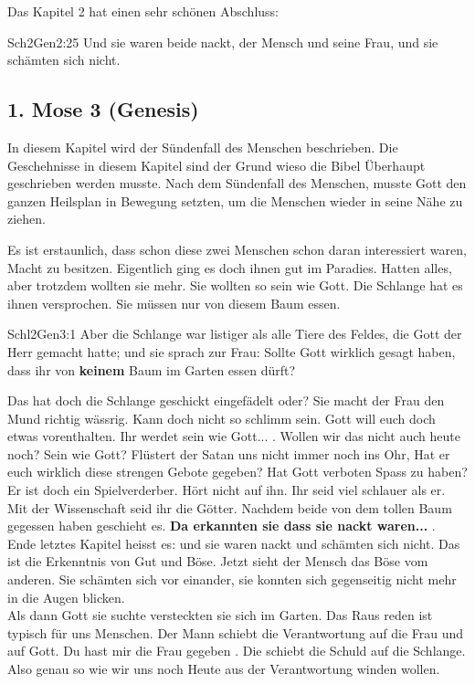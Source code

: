 Das Kapitel 2 hat einen sehr schönen Abschluss:
\begin{bibeltext}{Sch2}{Gen}{2:25}
	Und sie waren beide nackt, der Mensch und seine Frau, und sie schämten sich nicht.
\end{bibeltext}
\subsection{1. Mose 3 (Genesis)}
In diesem Kapitel wird der Sündenfall des Menschen beschrieben. Die Geschehnisse in diesem Kapitel sind der Grund wieso die Bibel Überhaupt geschrieben werden musste. Nach dem Sündenfall des Menschen, musste Gott den ganzen Heilsplan in Bewegung setzten, um die Menschen wieder in seine Nähe zu ziehen.

Es ist erstaunlich, dass schon diese zwei Menschen schon daran interessiert waren, Macht zu besitzen. Eigentlich ging es doch ihnen gut im Paradies. Hatten alles, aber trotzdem wollten sie mehr. Sie wollten so sein wie Gott. Die Schlange hat es ihnen versprochen. Sie müssen nur von diesem Baum essen.
\begin{bibeltext}{Schl2}{Gen}{3:1}
	Aber die Schlange war listiger als alle Tiere des Feldes, die Gott der Herr gemacht hatte; und sie sprach zur Frau: Sollte Gott wirklich gesagt haben, dass ihr von \textbf{keinem} Baum im Garten essen dürft?
\end{bibeltext}
Das hat doch die Schlange geschickt eingefädelt oder? Sie macht der Frau den Mund richtig wässrig. Kann doch nicht so schlimm sein. Gott will euch doch etwas vorenthalten. \flqq Ihr werdet sein wie Gott... \frqq{}. Wollen wir das nicht auch heute noch? Sein wie Gott? Flüstert der Satan uns nicht immer noch ins Ohr, \flqq Hat er euch wirklich diese strengen Gebote gegeben? Hat Gott verboten Spass zu haben? Er ist doch ein Spielverderber. Hört nicht auf ihn. Ihr seid viel schlauer als er. Mit der Wissenschaft seid ihr die Götter.\frqq{} 
Nachdem beide von dem tollen Baum gegessen haben geschieht es. \flqq \textbf{Da erkannten sie dass sie nackt waren...} \frqq{}. Ende letztes Kapitel heisst es: \flqq und sie waren nackt und schämten sich nicht\frqq{}. Das ist die Erkenntnis von Gut und Böse. Jetzt sieht der Mensch das Böse vom anderen. Sie schämten sich vor einander, sie konnten sich gegenseitig nicht mehr in die Augen blicken.\\
Als dann Gott sie suchte versteckten sie sich im Garten. Das Raus reden ist typisch für uns Menschen. Der Mann schiebt die Verantwortung auf die Frau und auf Gott. \flqq Du hast mir die Frau gegeben \frqq{}. Die schiebt die Schuld auf die Schlange. Also genau so wie wir uns noch Heute aus der Verantwortung winden wollen.

